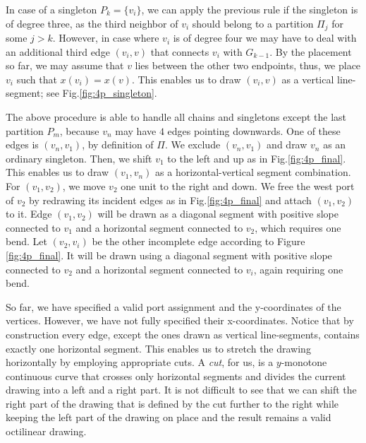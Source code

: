 \documentclass[a4paper,twoside,11pt]{article}
\begin{document}
In case of a singleton $P_k = \{ v_i \}$, we can apply the previous
rule if the singleton is of degree three, as the third neighbor of
$v_i$ should belong to a partition $\Pi_j$ for some $j > k$.
However, in case where $v_i$ is of degree four we may have to deal with
an additional third edge $(v_i, v)$ that connects $v_i$ with
$G_{k-1}$. By the placement so far, we may assume that $v$ lies
between the other two endpoints, thus, we place $v_i$ such that
$x(v_i) = x(v)$. This enables us to draw $(v_i, v)$ as a vertical
line-segment; see Fig.\ref{fig:4p_singleton}.

The above procedure is able to handle all chains and singletons
except the last partition $P_m$, because $v_n$ may have $4$ edges
pointing downwards. One of these edges is $(v_n, v_1)$, by
definition of $\Pi$. We exclude $(v_n, v_1)$ and draw $v_n$ as an
ordinary singleton. Then, we shift $v_1$ to the left and up as in
Fig.\ref{fig:4p_final}. This enables us to draw $(v_1, v_n)$ as a
horizontal-vertical segment combination. For $(v_1, v_2)$, we move
$v_2$ one unit to the right and down. We free the west port of $v_2$
by redrawing its incident edges as in Fig.\ref{fig:4p_final} and
attach $(v_1, v_2)$ to it. Edge $(v_1,v_2)$ will be drawn as a
diagonal segment with positive slope connected to $v_1$ and a
horizontal segment connected to $v_2$, which requires one bend. Let
$(v_2,v_i)$ be the other incomplete edge according to Figure
\ref{fig:4p_final}. It will be drawn using a diagonal segment with
positive slope connected to $v_2$ and a horizontal segment connected
to $v_i$, again requiring one bend.

So far, we have specified a valid port assignment and the
y-coordinates of the vertices. However, we have not fully specified
their x-coordinates. Notice that by construction every edge, except
the ones drawn as vertical line-segments, contains exactly one
horizontal segment. This enables us to stretch the drawing
horizontally by employing appropriate cuts. A \emph{cut}, for us, is
a $y$-monotone continuous curve that crosses only horizontal
segments and divides the current drawing into a left and a right
part. It is not difficult to see that we can shift the right part of
the drawing that is defined by the cut further to the right while
keeping the left part of the drawing on place and the result remains
a valid octilinear drawing.
\end{document}
